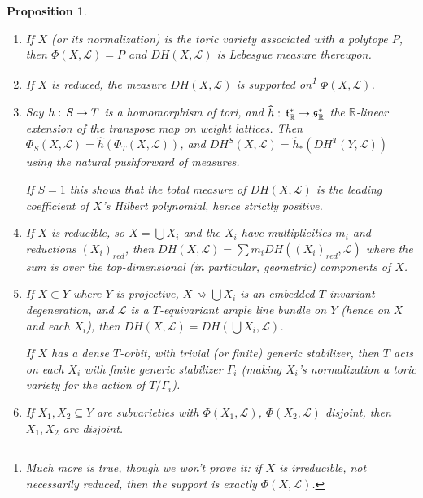 \documentclass[10pt,a4paper]{amsart}
\newtheorem{proposition}[Thm]{Proposition}
\newcommand{\RR}{\mathbb{R}}
\newcommand\wh\widehat
\newcommand\Union\bigcup
\newcommand\lie[1]{{\mathfrak #1}}
\newcommand\calL{{\mathcal L}}
\newcommand\junk[1]{}
\renewcommand{\colon}{\mathrel{:}}
\renewcommand{\colon}{:\mkern\thinmuskip}
\begin{document}
\begin{proposition}\label{prop:DH}
  \begin{enumerate}
  \item If $X$ (or its normalization) is the toric variety associated
    with a polytope $P$, then $\Phi(X,\calL) = P$ and $DH(X,\calL)$ is
    Lebesgue measure thereupon.  \junk{ \item If $X$ is irreducible,
      then the support of $DH(X,\calL)$ is the moment polytope $\Phi(X,\calL)$.}
  \item If $X$ is reduced, the measure $DH(X,\calL)$ is supported
    on\footnote{Much more is true, though we won't prove it:
    	if $X$ is irreducible, not necessarily reduced, then the support
    	is {\em exactly} $\Phi(X,\calL)$.} $\Phi(X,\calL)$. 
  \item Say $h\colon S \to T$ is a homomorphism of tori,
    and $\wh h\colon\lie t^*_\RR \to \lie s^*_\RR$ the $\RR$-linear
    extension of the transpose map on weight lattices. 
    Then $\Phi_S(X,\calL) = \wh h(\Phi_T(X,\calL))$, and
    $DH^S(X,\calL) = \wh h_*(DH^T(Y,\calL))$ using the natural
    pushforward of measures.

    If $S=1$ this shows that the total measure of $DH(X,\calL)$ is the
    leading coefficient of $X$'s Hilbert polynomial, hence strictly positive.
    \junk{
    \item If $X$ is irreducible, and $T$ acts with generic stabilizer $S$,
      then $\dim_\RR \Phi(X,\calL) = \dim(T/S)$. More specifically,
      $\Phi(X,\calL)$ is contained in a translate of $S^\perp$ (as in
      Proposition \ref{prop:spanOfPhi}).
    \item If $T$ acts on $Y$ with a dense orbit, and the generic stabilizer has
      $k$ components, then $DH(Y,\calL)$ is $\frac 1 k$ times Lebesgue measure
      on the moment polytope $\Phi(Y,\calL)$ (even if it is not of full dimension).
    }
  \item If $X$ is reducible, so $X = \Union X_i$ and the $X_i$ have
    multiplicities $m_i$ and reductions $(X_i)_{red}$, then
    $DH(X,\calL) = \sum m_i DH((X_i)_{red},\calL)$ where the sum is over the
    top-dimensional (in particular, geometric) components of $X$.
  \item If $X \subset Y$ where $Y$ is projective, $X \rightsquigarrow \Union X_i$ is an embedded
    $T$-invariant degeneration, and $\calL$ is a
    $T$-equivariant ample line bundle on $Y$ (hence on $X$ and each
    $X_i$), then $DH(X,\calL) = DH(\Union X_i,\calL)$.

    If $X$ has a dense $T$-orbit, with trivial (or finite)
    generic stabilizer, then $T$ acts on each $X_i$ with finite
    generic stabilizer $\Gamma_i$ (making $X_i$'s normalization
    a toric variety for the action of $T/\Gamma_i$).
  \item If $X_1,X_2 \subseteq Y$ are subvarieties with
    $\Phi(X_1,\calL)$, $\Phi(X_2,\calL)$ disjoint, then $X_1,X_2$ are disjoint.
  \end{enumerate}
\end{proposition}
\end{document}
